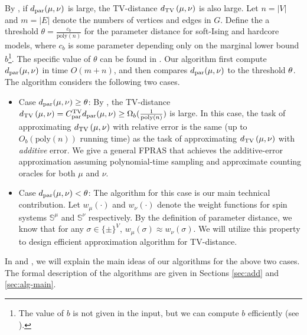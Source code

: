 By , if $d_\mathrm{par}(\mu,\nu)$ is large, the TV-distance $d_{\mathrm{TV}}\left({\mu},{\nu}\right)$ is also large. Let $n = |V|$ and $m = |E|$ denote the numbers of vertices and edges in $G$. Define the a threshold $\theta = \frac{c_b}{\text{poly}(n)}$ for the parameter distance for soft-Ising and hardcore models, where $c_b$ is some parameter depending only on the marginal lower bound $b$\footnote{The value of $b$ is not given in the input, but we can compute $b$ efficiently (see ).}. The specific value of $\theta$ can be found in .
Our algorithm first compute $d_\mathrm{par}(\mu,\nu)$ in time $O(m+n)$, and then compares $d_\mathrm{par}(\mu,\nu)$ to the threshold $\theta$. The algorithm considers the following two cases.
\begin{itemize}
    \item Case $d_\mathrm{par}(\mu,\nu) \geq \theta$: By , the TV-distance $d_{\mathrm{TV}}\left({\mu},{\nu}\right) = C^\text{TV}_{\mathrm{par}} d_\mathrm{par}(\mu,\nu) \geq \Omega_b(\frac{1}{\mathrm{poly}(n)})$ is large. In this case, the task of approximating $d_{\mathrm{TV}}\left({\mu},{\nu}\right)$ with relative error is the same (up to $O_b(\mathrm{poly}(n))$ running time) as the task of approximating $d_{\mathrm{TV}}\left({\mu},{\nu}\right)$ with \emph{additive} error. We give a general FPRAS that achieves the additive-error approximation assuming polynomial-time sampling and approximate counting oracles for both $\mu$ and $\nu$.
    \item Case $d_\mathrm{par}(\mu,\nu) < \theta$: The algorithm for this case is our main technical contribution.  Let $w_{\mu}(\cdot)$ and $w_\nu(\cdot)$ denote the weight functions for spin systems $\mathbb{S}^\mu$ and $\mathbb{S}^\nu$ respectively.
    By the definition of parameter distance, we know that for any $\sigma \in \{\pm\}^V$, $w_\mu(\sigma) \approx w_\nu(\sigma)$. 
    We will utilize this property to design efficient approximation algorithm for TV-distance. 
\end{itemize}
In  and , we will explain the main ideas of our algorithms for the above two cases.
The formal description of the algorithms are given in Sections \ref{sec:add} and \ref{sec:alg-main}.

